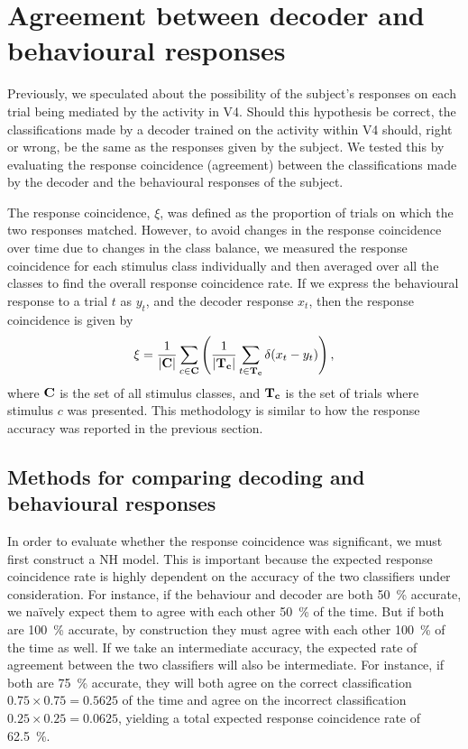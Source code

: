 \section{Agreement between decoder and behavioural responses}
\label{sec:pl_agreement}

Previously, we speculated about the possibility of the subject's responses on each trial being mediated by the activity in \ac{V4}.
Should this hypothesis be correct, the classifications made by a decoder trained on the activity within \ac{V4} should, right or wrong, be the same as the responses given by the subject.
We tested this by evaluating the response coincidence (agreement) between the classifications made by the decoder and the behavioural responses of the subject.

The response coincidence, $\xi$, was defined as the proportion of trials on which the two responses matched.
However, to avoid changes in the response coincidence over time due to changes in the class balance, we measured the response coincidence for each stimulus class individually and then averaged over all the classes to find the overall response coincidence rate.
If we express the behavioural response to a trial $t$ as $y_t$, and the decoder response $x_t$, then the response coincidence is given by
\begin{equation}
\label{eq:agreement}
\xi = \frac{1}{|\mathbf{C}|} \sum_{c \in \mathbf{C}} \left( \frac{1}{|\mathbf{T_c}|} \sum_{t \in \mathbf{T_c}} \delta(x_t - y_t) \right)
,\end{equation}
where $\mathbf{C}$ is the set of all stimulus classes, and $\mathbf{T_c}$ is the set of trials where stimulus $c$ was presented.
This methodology is similar to how the response accuracy was reported in the previous section.


\subsection{Methods for comparing decoding and behavioural responses}
\label{sec:dec-meth-prob}

In order to evaluate whether the response coincidence was significant, we must first construct a \acf{NH} model.
This is important because the expected response coincidence rate is highly dependent on the accuracy of the two classifiers under consideration.
For instance, if the behaviour and decoder are both \SI{50}{\percent} accurate, we na\"ively expect them to agree with each other \SI{50}{\percent} of the time.
But if both are \SI{100}{\percent} accurate, by construction they must agree with each other \SI{100}{\percent} of the time as well.
If we take an intermediate accuracy, the expected rate of agreement between the two classifiers will also be intermediate.
For instance, if both are \SI{75}{\percent} accurate, they will both agree on the correct classification $0.75 \times 0.75 = 0.5625$ of the time and agree on the incorrect classification $0.25 \times 0.25 = 0.0625$, yielding a total expected response coincidence rate of \SI{62.5}{\percent}.

